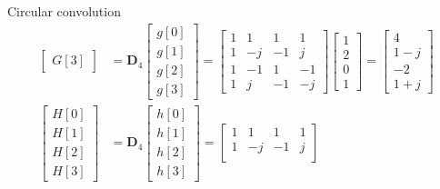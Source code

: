 \documentclass[../../main/main.tex]{subfiles}
\begin{document}
\begin{example}{Circular convolution}{}
\begin{align}
\begin{bmatrix}
            G[3]
        \end{bmatrix}
        &=
            \mathbf{D}_{4}
            \begin{bmatrix}
                g[0]    \\
                g[1]    \\
                g[2]    \\
                g[3]
            \end{bmatrix}
            =
            \begin{bmatrix}
                1   &   1   &   1   &   1   \\
                1   &   -j  &   -1  &   j   \\
                1   &   -1  &   1   &   -1  \\
                1   &   j   &   -1  &   -j
            \end{bmatrix}
            \begin{bmatrix}
                1   \\
                2   \\
                0   \\
                1
            \end{bmatrix}
            =
            \begin{bmatrix}
                4   \\
                1-j \\
                -2  \\
                1+j
            \end{bmatrix}   \\
        \begin{bmatrix}
            H[0]    \\
            H[1]    \\
            H[2]    \\
            H[3]
        \end{bmatrix}
        &=
            \mathbf{D}_{4}
            \begin{bmatrix}
                h[0]    \\
                h[1]    \\
                h[2]    \\
                h[3]
            \end{bmatrix}
            =
            \begin{bmatrix}
                1   &   1   &   1   &   1   \\
                1   &   -j  &   -1  &   j   \\

\end{bmatrix}
\end{align}
\end{example}
\end{document}
